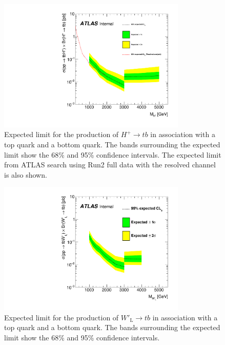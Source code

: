 \begin{figure}[H]
  \centering
  \includegraphics[width=0.8\textwidth]{images/ProfileLHFit/XSUpperLimits_Hp.pdf}
  \caption{Expected limit for the production of $H^{+}{\rightarrow}tb$ in association with a top quark and a bottom quark. The bands surrounding the expected limit show the 68\% and 95\% confidence intervals. The expected limit from ATLAS search using Run2 full data with the resolved channel is also shown\cite{HDBS-2021-02}.}
  \label{fig:XSLimits_Hp}
\end{figure}

\begin{figure}[H]
  \centering
  \includegraphics[width=0.8\textwidth]{images/ProfileLHFit/XSUpperLimits_Wp-LH.pdf}
  \caption{Expected limit for the production of $W'_{\text{L}}{\rightarrow}tb$ in association with a top quark and a bottom quark. The bands surrounding the expected limit show the 68\% and 95\% confidence intervals.}
  \label{fig:XSLimits_WpLH}
\end{figure}



